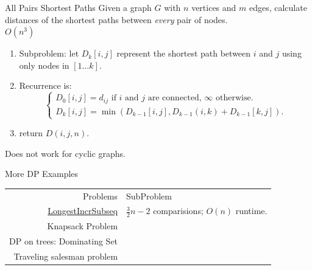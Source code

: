 \documentclass[10pt,a4paper]{article}
\begin{document}
\begin{multicols}{3}
\begin{textbox}{All Pairs Shortest Paths}
    Given a graph $G$ with $n$ vertices and $m$ edges, calculate distances of the shortest paths between {\em every} pair of nodes. \\
  $O(n^3)$
\begin{enumerate}
    \item Subproblem: let $D_k[i,j]$ represent the shortest path between $i$ and $j$ using only nodes in $[1\ldots k]$.
    \item Recurrence is:
    \[\begin{cases}
            D_0[i,j] = d_{ij} \text{ if } i \text{ and } j \text{ are connected, } \infty \text{ otherwise}. \\ 
            D_k[i,j] = \min(D_{k - 1}[i,j], D_{k - 1}(i,k)+D_{k - 1}[k,j]). 
    \end{cases}\]
    \item return $D(i,j,n)$.
\end{enumerate}
 Does not work for cyclic graphs.
\end{textbox}

\begin{textbox}{More DP Examples}
    \begin{tabular}{r|p{}}\scriptsize
        Problems  & SubProblem \\
        \href{https://leetcode.com/problems/longest-increasing-subsequence/}{LongestIncrSubseq} & $\frac{3}{2}n - 2$ comparisions; $O(n)$ runtime.\\
        Knapsack Problem &   \\
        DP on trees: Dominating Set &   \\
        Traveling salesman problem &   \\
    \end{tabular}
    
\end{textbox}


\end{multicols}
\end{document}
